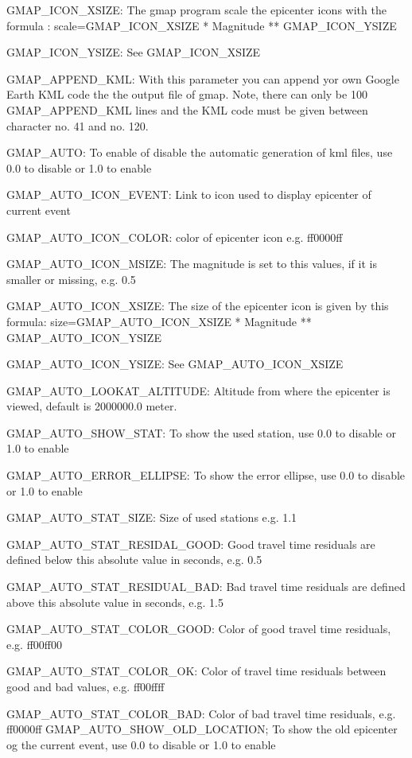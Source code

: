 GMAP\_ICON\_XSIZE: The gmap program scale the epicenter icons with 
the formula : \newline
scale=GMAP\_ICON\_XSIZE * Magnitude ** GMAP\_ICON\_YSIZE 

GMAP\_ICON\_YSIZE: See GMAP\_ICON\_XSIZE 

GMAP\_APPEND\_KML: With this parameter you can 
append yor own Google Earth KML code the the 
output file of gmap. Note, there can only be 100 GMAP\_APPEND\_KML 
lines and the KML code must be given between character no. 41 and no. 120. 

GMAP\_AUTO: To enable of disable the automatic generation of kml files, use 0.0 to disable or 1.0 to enable

GMAP\_AUTO\_ICON\_EVENT: Link to icon used to display epicenter of current event

GMAP\_AUTO\_ICON\_COLOR: color of epicenter icon e.g. ff0000ff

GMAP\_AUTO\_ICON\_MSIZE: The magnitude is set to this values, if it is smaller or missing, e.g. 0.5

GMAP\_AUTO\_ICON\_XSIZE: The size of the epicenter icon is given by this formula:\newline
size=GMAP\_AUTO\_ICON\_XSIZE * Magnitude ** GMAP\_AUTO\_ICON\_YSIZE

GMAP\_AUTO\_ICON\_YSIZE: See GMAP\_AUTO\_ICON\_XSIZE

GMAP\_AUTO\_LOOKAT\_ALTITUDE: Altitude from where the epicenter is viewed, default is 2000000.0 meter.

GMAP\_AUTO\_SHOW\_STAT: To show the used station, use 0.0 to disable or 1.0 to enable

GMAP\_AUTO\_ERROR\_ELLIPSE: To show the error ellipse, use 0.0 to disable or 1.0 to enable

GMAP\_AUTO\_STAT\_SIZE: Size of used stations e.g. 1.1

GMAP\_AUTO\_STAT\_RESIDAL\_GOOD: Good travel time residuals are defined below this absolute value in seconds, e.g. 0.5

GMAP\_AUTO\_STAT\_RESIDUAL\_BAD: Bad travel time residuals are defined above this absolute value in seconds, e.g. 1.5

GMAP\_AUTO\_STAT\_COLOR\_GOOD: Color of good travel time residuals, e.g. ff00ff00

GMAP\_AUTO\_STAT\_COLOR\_OK: Color of travel time residuals between good and bad values, e.g. ff00ffff

GMAP\_AUTO\_STAT\_COLOR\_BAD: Color of bad travel time residuals, e.g. ff0000ff GMAP\_AUTO\_SHOW\_OLD\_LOCATION; To show the old epicenter og the current event, use 0.0 to disable or 1.0 to enable

